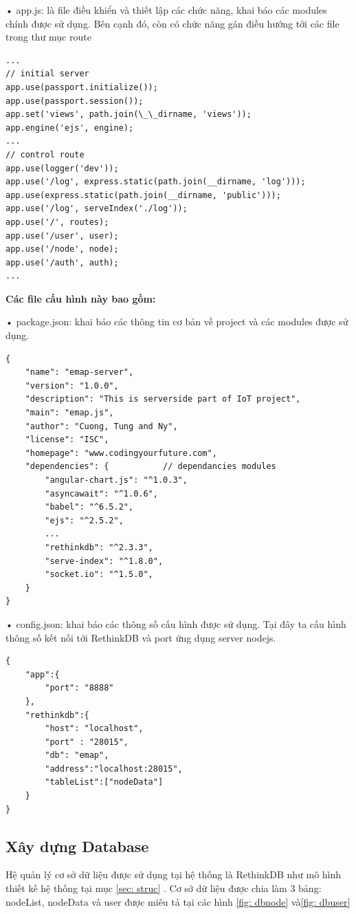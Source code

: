• app.js: là file điều khiển và thiết lập các chức năng, khai báo các modules chính được sử dụng. Bên cạnh đó, còn có chức năng gán điều hướng tới các file trong thư mục route
\begin{lstlisting}[caption=app.js]
...
// initial server
app.use(passport.initialize());
app.use(passport.session());
app.set('views', path.join(\_\_dirname, 'views'));
app.engine('ejs', engine);
...
// control route
app.use(logger('dev'));
app.use('/log', express.static(path.join(__dirname, 'log')));
app.use(express.static(path.join(__dirname, 'public')));
app.use('/log', serveIndex('./log'));
app.use('/', routes);
app.use('/user', user);
app.use('/node', node);
app.use('/auth', auth);
...
\end{lstlisting}

\textbf{Các file cấu hình này bao gồm:}

• package.json: khai báo các thông tin cơ bản về project và các modules được sử dụng.
\begin{lstlisting}[caption=package.json]
{
	"name": "emap-server",
	"version": "1.0.0",
	"description": "This is serverside part of IoT project",
	"main": "emap.js",
	"author": "Cuong, Tung and Ny",
	"license": "ISC",
	"homepage": "www.codingyourfuture.com",
	"dependencies": {			// dependancies modules
		"angular-chart.js": "^1.0.3",
		"asyncawait": "^1.0.6",
		"babel": "^6.5.2",
		"ejs": "^2.5.2",
		...
		"rethinkdb": "^2.3.3",
		"serve-index": "^1.8.0",
		"socket.io": "^1.5.0",
	}
}
\end{lstlisting}
• config.json: khai báo các thông số cấu hình được sử dụng. Tại đây ta cấu hình thông số kết nối tới RethinkDB và port ứng dụng server nodejs.
\begin{lstlisting}[caption=config.json]
{
	"app":{
		"port": "8888"
	},
	"rethinkdb":{
		"host": "localhost",
		"port" : "28015",
		"db": "emap",
		"address":"localhost:28015",
		"tableList":["nodeData"]
	}
}

\end{lstlisting}





\subsection{Xây dựng Database}
Hệ quản lý cơ sở dữ liệu được sử dụng tại hệ thống là RethinkDB như mô hình thiết kế hệ thống tại mục \ref{sec: struc} . Cơ sở dữ liệu được chia làm 3 bảng: nodeList, nodeData và user được miêu tả tại các hình \ref{fig: dbnode} và\ref{fig: dbuser}

